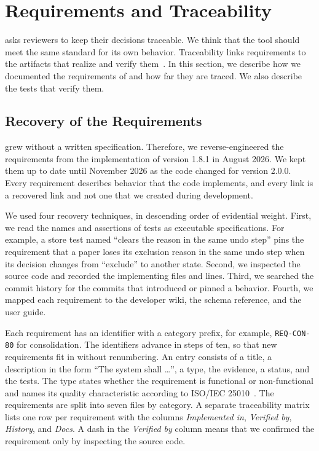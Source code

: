 \section{Requirements and Traceability}\label{sec:requirements}

\SaiLoR asks reviewers to keep their decisions traceable.
We think that the tool should meet the same standard for its own behavior.
Traceability links requirements to the artifacts that realize and verify them~\cite{gotel1994analysis,clelandhuang2014software}.
In this section, we describe how we documented the requirements of \SaiLoR and how far they are traced.
We also describe the tests that verify them.

\subsection{Recovery of the Requirements}\label{sec:requirements-method}

\SaiLoR grew without a written specification.
Therefore, we reverse-engineered the requirements from the implementation of version 1.8.1 in August 2026.
We kept them up to date until November 2026 as the code changed for version 2.0.0.
Every requirement describes behavior that the code implements, and every link is a recovered link and not one that we created during development.

We used four recovery techniques, in descending order of evidential weight.
First, we read the names and assertions of tests as executable specifications.
For example, a store test named \enquote{clears the reason in the same undo step} pins the requirement that a paper loses its exclusion reason in the same undo step when its decision changes from \enquote{exclude} to another state.
Second, we inspected the source code and recorded the implementing files and lines.
Third, we searched the commit history for the commits that introduced or pinned a behavior.
Fourth, we mapped each requirement to the developer wiki, the schema reference, and the user guide.

Each requirement has an identifier with a category prefix, for example, \texttt{REQ-CON-80} for consolidation.
The identifiers advance in steps of ten, so that new requirements fit in without renumbering.
An entry consists of a title, a description in the form \enquote{The system shall \ldots}, a type, the evidence, a status, and the tests.
The type states whether the requirement is functional or non-functional and names its quality characteristic according to ISO/IEC 25010~\cite{iso25010}.
The requirements are split into seven files by category.
A separate traceability matrix lists one row per requirement with the columns \emph{Implemented in}, \emph{Verified by}, \emph{History}, and \emph{Docs}.
A dash in the \emph{Verified by} column means that we confirmed the requirement only by inspecting the source code.

